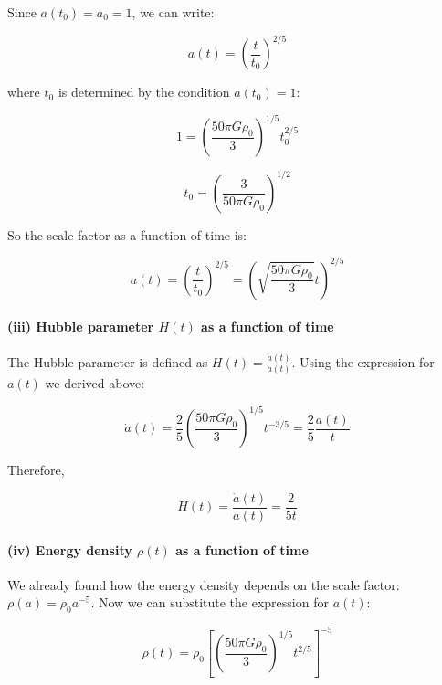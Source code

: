 \documentclass{article}
\begin{document}
Since $a(t_0) = a_0 = 1$, we can write:

\begin{equation}
a(t) = \left(\frac{t}{t_0}\right)^{2/5}
\end{equation}

where $t_0$ is determined by the condition $a(t_0) = 1$:

\begin{equation}
1 = \left(\frac{50\pi G \rho_0}{3}\right)^{1/5} t_0^{2/5}
\end{equation}

\begin{equation}
t_0 = \left(\frac{3}{50\pi G \rho_0}\right)^{1/2}
\end{equation}

So the scale factor as a function of time is:

\begin{equation}
a(t) = \left(\frac{t}{t_0}\right)^{2/5} = \left(\sqrt{\frac{50\pi G \rho_0}{3}} t\right)^{2/5}
\end{equation}

\paragraph{(iii) Hubble parameter $H(t)$ as a function of time}

The Hubble parameter is defined as $H(t) = \frac{\dot{a}(t)}{a(t)}$. Using the expression for $a(t)$ we derived above:

\begin{equation}
\dot{a}(t) = \frac{2}{5} \left(\frac{50\pi G \rho_0}{3}\right)^{1/5} t^{-3/5} = \frac{2}{5} \frac{a(t)}{t}
\end{equation}

Therefore,

\begin{equation}
H(t) = \frac{\dot{a}(t)}{a(t)} = \frac{2}{5t}
\end{equation}

\paragraph{(iv) Energy density $\rho(t)$ as a function of time}

We already found how the energy density depends on the scale factor: $\rho(a) = \rho_0 a^{-5}$. Now we can substitute the expression for $a(t)$:

\begin{equation}
\rho(t) = \rho_0 \left[\left(\frac{50\pi G \rho_0}{3}\right)^{1/5} t^{2/5}\right]^{-5}
\end{equation}
\end{document}
